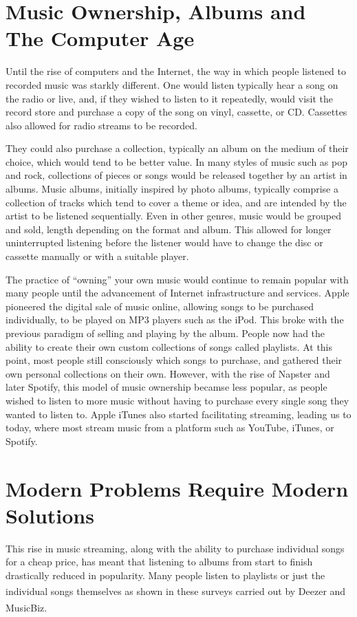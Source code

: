 \documentclass[a4paper, 12pt]{report}
\begin{document}
\section[Music Ownership, Albums and The Computer Age]{Music Ownership, Albums and \\ The Computer Age}
Until the rise of computers and the Internet, the way in which people listened to recorded music was starkly different. One would listen typically hear a song on the radio or live, and,
if they wished to listen to it repeatedly, would visit the record store and purchase a copy of the song on vinyl, cassette, or CD. 
Cassettes also allowed for radio streams to be recorded.

They could also purchase a collection, typically an album on the medium of their choice, which would tend to be better value.
In many styles of music such as pop and rock, collections of pieces or songs would be released together by an artist in albums.
Music albums, initially inspired by photo albums, typically comprise a collection of tracks which tend to cover a theme or idea, and are intended by the artist to be listened sequentially.
Even in other genres, music would be grouped and sold, length depending on the format and album. This allowed for longer uninterrupted listening before the
listener would have to change the disc or cassette manually or with a suitable player.

The practice of ``owning'' your own music would continue to remain popular with many people until the advancement of Internet infrastructure and services.
Apple pioneered the digital sale of music online, allowing songs to be purchased individually, to be played on MP3 players such as the iPod.
This broke with the previous paradigm of selling and playing by the album. People now had the ability to create their own custom collections of songs called playlists.
At this point, most people still consciously which songs to purchase, and gathered their own personal collections on their own.
However, with the rise of Napster and later Spotify, this model of music ownership becamse less popular, as people wished to listen to more music without having
to purchase every single song they wanted to listen to. Apple iTunes also started facilitating streaming, leading us to today, where most stream music 
from a platform such as YouTube, iTunes, or Spotify.

\section[Modern Problems Require Modern Solutions]{Modern Problems Require Modern \\ Solutions}
This rise in music streaming, along with the ability to purchase individual songs for a cheap price, has meant that listening to albums from start to finish
drastically reduced in popularity. Many people listen to playlists or just the individual songs themselves as shown in these surveys
carried out by Deezer\textsuperscript{\cite{deezer}} and MusicBiz\textsuperscript{\cite{musicbiz}}.
\end{document}
